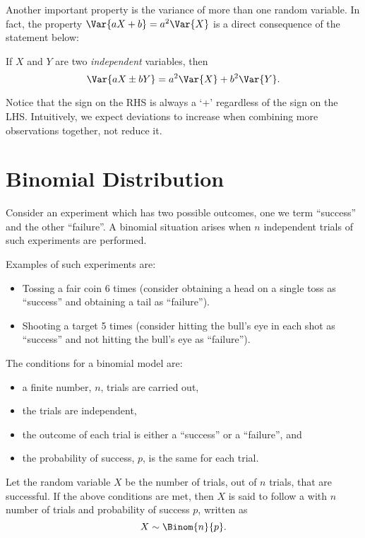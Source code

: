 Another important property is the variance of more than one random variable. In fact, the property $\Var{aX + b} = a^2 \Var{X}$ is a direct consequence of the statement below:

\begin{proposition}
    If $X$ and $Y$ are two \emph{independent} variables, then \[\Var{aX \pm bY} = a^2 \Var{X} + b^2 \Var{Y}.\]
\end{proposition}

Notice that the sign on the RHS is always a `+' regardless of the sign on the LHS. Intuitively, we expect deviations to increase when combining more observations together, not reduce it.

\section{Binomial Distribution}

Consider an experiment which has two possible outcomes, one we term ``success'' and the other ``failure''. A binomial situation arises when $n$ independent trials of such experiments are performed.

Examples of such experiments are:
\begin{itemize}
    \item Tossing a fair coin 6 times (consider obtaining a head on a single toss as ``success'' and obtaining a tail as ``failure'').
    \item Shooting a target 5 times (consider hitting the bull's eye in each shot as ``success'' and not hitting the bull's eye as ``failure'').
\end{itemize}

\begin{condition}
    The conditions for a binomial model are:
    \begin{itemize}
        \item a finite number, $n$, trials are carried out,
        \item the trials are independent,
        \item the outcome of each trial is either a ``success'' or a ``failure'', and
        \item the probability of success, $p$, is the same for each trial.
    \end{itemize}
\end{condition}

\begin{definition}
    Let the random variable $X$ be the number of trials, out of $n$ trials, that are successful. If the above conditions are met, then $X$ is said to follow a  with $n$ number of trials and probability of success $p$, written as \[X \sim \Binom{n}{p}.\]
\end{definition}

